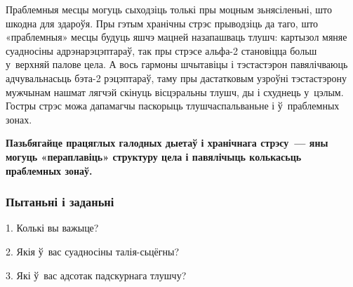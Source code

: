 Праблемныя месцы могуць сыходзіць толькі пры моцным зьнясіленьні, што шкодна для здароўя. Пры гэтым хранічны стрэс прыводзіць да таго, што «праблемныя» месцы будуць яшчэ мацней назапашваць тлушч: картызол мяняе суадносіны адрэнарэцэптараў, так пры стрэсе альфа-2 становіцца больш у~верхняй палове цела. А вось гармоны шчытавіцы і тэстастэрон павялічваюць адчувальнасьць бэта-2 рэцэптараў, таму пры дастатковым узроўні тэстастэрону мужчынам нашмат лягчэй скінуць вісцэральны тлушч, ды і схуднець у~цэлым. Гостры стрэс можа дапамагчы паскорыць тлушчаспальваньне і ў~праблемных зонах. 

\textbf{Пазьбягайце працяглых галодных дыетаў і хранічнага стрэсу~--- яны могуць «пераплавіць» структуру цела і павялічыць колькасьць праблемных зонаў.}

\subsubsection{Пытаньні і заданьні}

1. Колькі вы важыце?

2. Якія ў~вас суадносіны талія-сьцёгны?

3. Які ў~вас адсотак падскурнага тлушчу?

